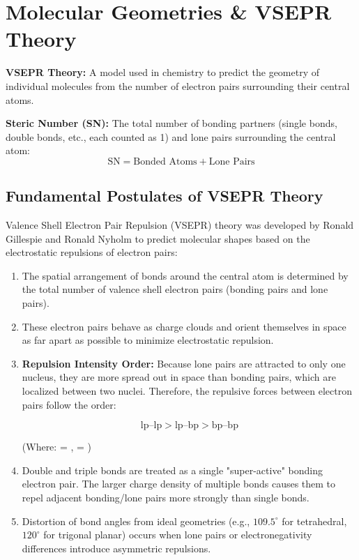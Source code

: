 \documentclass[12pt,a4paper]{article}
\begin{document}
\section{Molecular Geometries \& VSEPR Theory}

\begin{tcolorbox}[defbox, title={Definitions: VSEPR and Steric Number}]
  \textbf{VSEPR Theory:} A model used in chemistry to predict the geometry of individual molecules from the number of electron pairs surrounding their central atoms.
  \par\vspace{4pt}
  \textbf{Steric Number (SN):} The total number of bonding partners (single bonds, double bonds, etc., each counted as 1) and lone pairs surrounding the central atom:
  \[ \text{SN} = \text{Bonded Atoms} + \text{Lone Pairs} \]
\end{tcolorbox}

\subsection{Fundamental Postulates of VSEPR Theory}
Valence Shell Electron Pair Repulsion (VSEPR) theory was developed by Ronald Gillespie and Ronald Nyholm to predict molecular shapes based on the electrostatic repulsions of electron pairs:

\begin{enumerate}
  \item The spatial arrangement of bonds around the central atom is determined by the total number of valence shell electron pairs (bonding pairs and lone pairs).
  \item These electron pairs behave as charge clouds and orient themselves in space as far apart as possible to minimize electrostatic repulsion.
  \item \textbf{Repulsion Intensity Order:} Because lone pairs are attracted to only one nucleus, they are more spread out in space than bonding pairs, which are localized between two nuclei. Therefore, the repulsive forces between electron pairs follow the order:
    \begin{tcolorbox}[formulabox, title={VSEPR Repulsion Order}]
      \[ \text{lp--lp} > \text{lp--bp} > \text{bp--bp} \]
      \par\centering\small (Where: \;  = , \;  = )
    \end{tcolorbox}
  \item Double and triple bonds are treated as a single "super-active" bonding electron pair. The larger charge density of multiple bonds causes them to repel adjacent bonding/lone pairs more strongly than single bonds.
  \item Distortion of bond angles from ideal geometries (e.g., $109.5^\circ$ for tetrahedral, $120^\circ$ for trigonal planar) occurs when lone pairs or electronegativity differences introduce asymmetric repulsions.
\end{enumerate}
\end{document}
